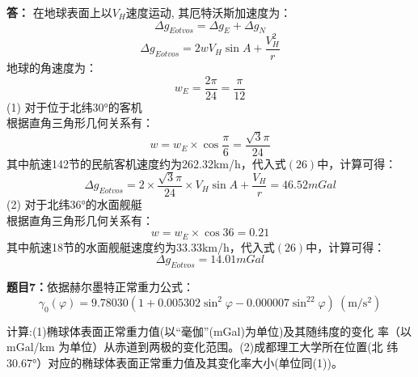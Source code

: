 \documentclass[12pt,a4paper]{article}
\begin{document}
\vspace{5pt}
\noindent
{\bf 答：}
在地球表面上以$V_H$速度运动, 其厄特沃斯加速度为：
\begin{equation}
    \Delta g_{Eotvos} = \Delta g_E + \Delta g_N
\end{equation}
\begin{equation}
    \Delta g_{Eotvos} = 2w V_H \sin A + \frac{V_H^2}{r}
\end{equation}
地球的角速度为：
\begin{equation}
    w_E = \frac{2 \pi}{24} = \frac{\pi}{12}
\end{equation}
(1) 对于位于北纬30°的客机 \\
根据直角三角形几何关系有：
\begin{equation}
    w = w_E \times \cos \frac{\pi}{6} = \frac{\sqrt{3} \pi}{24}
\end{equation}
其中航速142节的民航客机速度约为262.32km/h，代入式$(26)$中，计算可得：
\begin{equation}
    \Delta g_{Eotvos} = 2 \times \frac{\sqrt{3} \pi}{24} \times V_H \sin A 
    + \frac{V_H}{r} = 46.52 mGal
\end{equation}
(2) 对于北纬36°的水面舰艇\\
根据直角三角形几何关系有：
\begin{equation}
    w = w_E \times \cos 36 = 0.21
\end{equation}
其中航速18节的水面舰艇速度约为33.33km/h，代入式$(26)$中，计算可得：
\begin{equation}
    \Delta g_{Eotvos} = 14.01 mGal
\end{equation}


\vspace{10pt}
\noindent
{\bf 题目7：}依据赫尔墨特正常重力公式：
\begin{equation}
    \gamma_0(\varphi)=9.78030\left(1+0.005302\sin^2\varphi-0.000007\sin^22\varphi\right)\mathrm{~(m/s^2)}
\end{equation}

\noindent
计算:(1)椭球体表面正常重力值(以“毫伽”(mGal)为单位)及其随纬度的变化
率（以 mGal/km 为单位）从赤道到两极的变化范围。(2)成都理工大学所在位置(北
纬 30.67°）对应的椭球体表面正常重力值及其变化率大小(单位同(1))。
\end{document}
